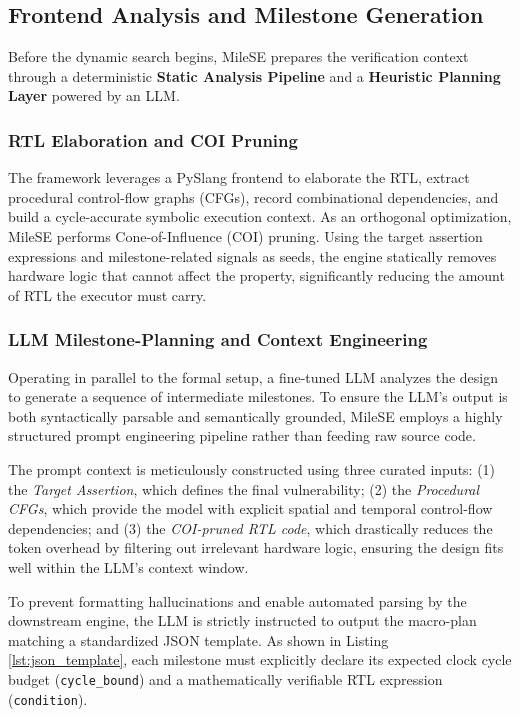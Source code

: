 \documentclass[conference]{IEEEtran}
\begin{document}
\subsection{Frontend Analysis and Milestone Generation}
Before the dynamic search begins, MileSE prepares the verification context through a deterministic \textbf{Static Analysis Pipeline} and a \textbf{Heuristic Planning Layer} powered by an LLM.

\subsubsection{RTL Elaboration and COI Pruning}
The framework leverages a PySlang frontend to elaborate the RTL, extract procedural control-flow graphs (CFGs), record combinational dependencies, and build a cycle-accurate symbolic execution context. As an orthogonal optimization, MileSE performs Cone-of-Influence (COI) pruning. Using the target assertion expressions and milestone-related signals as seeds, the engine statically removes hardware logic that cannot affect the property, significantly reducing the amount of RTL the executor must carry.

\subsubsection{LLM Milestone-Planning and Context Engineering}
Operating in parallel to the formal setup, a fine-tuned LLM analyzes the design to generate a sequence of intermediate milestones. To ensure the LLM's output is both syntactically parsable and semantically grounded, MileSE employs a highly structured prompt engineering pipeline rather than feeding raw source code. 

The prompt context is meticulously constructed using three curated inputs: (1) the \textit{Target Assertion}, which defines the final vulnerability; (2) the \textit{Procedural CFGs}, which provide the model with explicit spatial and temporal control-flow dependencies; and (3) the \textit{COI-pruned RTL code}, which drastically reduces the token overhead by filtering out irrelevant hardware logic, ensuring the design fits well within the LLM's context window.

To prevent formatting hallucinations and enable automated parsing by the downstream engine, the LLM is strictly instructed to output the macro-plan matching a standardized JSON template. As shown in Listing \ref{lst:json_template}, each milestone must explicitly declare its expected clock cycle budget (\texttt{cycle\_bound}) and a mathematically verifiable RTL expression (\texttt{condition}). 
\end{document}
